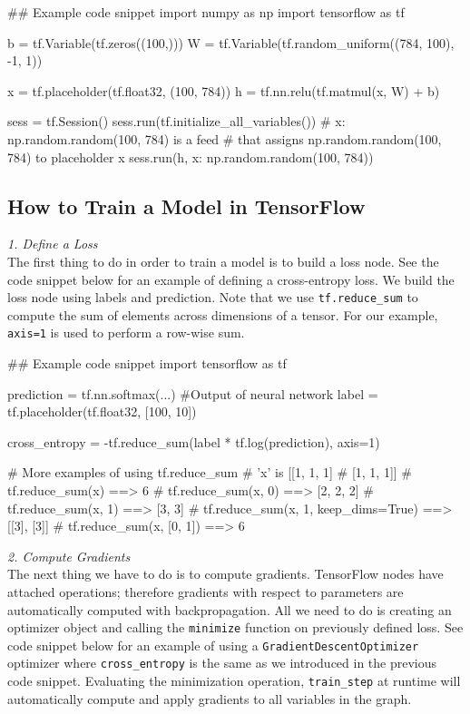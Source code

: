 \documentclass{tufte-handout}
\begin{document}
\begin{python}
## Example code snippet
import numpy as np
import tensorflow as tf

b = tf.Variable(tf.zeros((100,)))
W = tf.Variable(tf.random_uniform((784, 100),
                -1, 1))

x = tf.placeholder(tf.float32, (100, 784))
h = tf.nn.relu(tf.matmul(x, W) + b)

sess = tf.Session()
sess.run(tf.initialize_all_variables())
# {x: np.random.random(100, 784)} is a feed 
# that assigns np.random.random(100, 784) to placeholder x
sess.run(h, {x: np.random.random(100, 784)})

\end{python}

\subsection{How to Train a Model in TensorFlow}

\textit{1. Define a Loss} \\
The first thing to do in order to train a model is to build a loss node. See the code snippet below for an example of defining a cross-entropy loss. We build the loss node using labels and prediction. Note that we use \texttt{tf.reduce\_sum} to compute the sum of elements across dimensions of a tensor. For our example, \texttt{axis=1} is used to perform a row-wise sum.

\begin{python}
## Example code snippet
import tensorflow as tf

prediction = tf.nn.softmax(...)  #Output of neural network
label = tf.placeholder(tf.float32, [100, 10])

cross_entropy = -tf.reduce_sum(label * tf.log(prediction), axis=1)

# More examples of using tf.reduce_sum
# 'x' is [[1, 1, 1]
#         [1, 1, 1]]
# tf.reduce_sum(x) ==> 6
# tf.reduce_sum(x, 0) ==> [2, 2, 2]
# tf.reduce_sum(x, 1) ==> [3, 3]
# tf.reduce_sum(x, 1, keep_dims=True) ==> [[3], [3]]
# tf.reduce_sum(x, [0, 1]) ==> 6
\end{python}

\noindent
\textit{2. Compute Gradients} \\
The next thing we have to do is to compute gradients. TensorFlow nodes have attached operations; therefore gradients with respect to parameters are automatically computed with backpropagation. All we need to do is creating an optimizer object and calling the \texttt{minimize} function on previously defined loss. See code snippet below for an example of using a \texttt{GradientDescentOptimizer} optimizer where \texttt{cross\_entropy} is the same as we introduced in the previous code snippet. Evaluating the minimization operation, \texttt{train\_step} at runtime will automatically compute and apply gradients to all variables in the graph.
\end{document}

